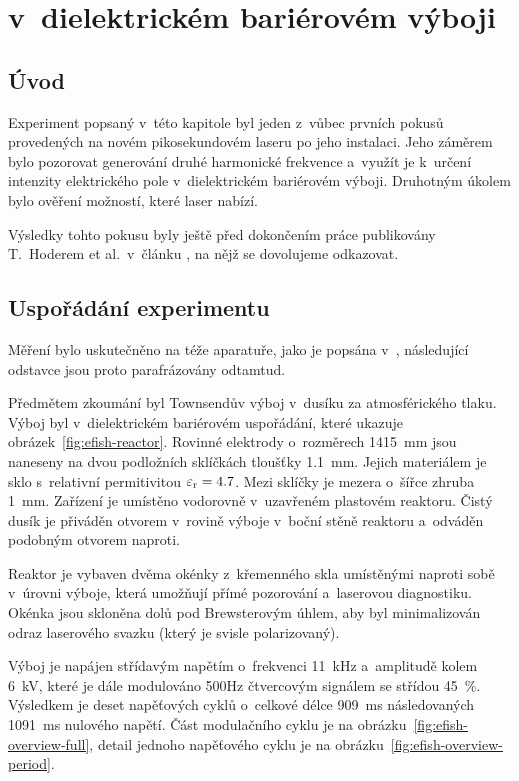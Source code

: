 \chapter[\EFISH]{{\EFISH} v~dielektrickém bariérovém výboji}

\newcommand\ypos{y}

\section{Úvod}
\label{sec:efish-intro}
Experiment popsaný v~této kapitole byl jeden z~vůbec prvních pokusů
provedených na novém pikosekundovém laseru po jeho instalaci.
Jeho záměrem bylo pozorovat generování druhé harmonické frekvence
a~využít je k~určení intenzity elektrického pole v~dielektrickém
bariérovém výboji.
%
Druhotným úkolem bylo ověření možností, které laser nabízí.

Výsledky tohto pokusu byly ještě před dokončením práce publikovány
T.~Hoderem et al.~v~článku \cite{efish-nitrogen}, na nějž se dovolujeme
odkazovat.

\section{Uspořádání experimentu}
\label{sec:efish-setup}
Měření bylo uskutečněno na téže aparatuře, jako je popsána
v~\cite{efish-nitrogen},
následující odstavce jsou proto parafrázovány odtamtud.

Předmětem zkoumání byl Townsendův výboj v~dusíku za atmosférického tlaku.
Výboj byl v~dielektrickém bariérovém uspořádání, které ukazuje
obrázek~\ref{fig:efish-reactor}.
Rovinné elektrody o~rozměrech \num{14}\times\SI{15}{\milli\metre}
jsou naneseny na dvou podložních sklíčkách tloušťky \SI{1.1}{\milli\metre}.
Jejich materiálem je sklo s~relativní permitivitou ${\varepsilon_\text{r} = \num{4.7}}$.
Mezi sklíčky je mezera o~šířce zhruba \SI{1}{\milli\metre}.
Zařízení je umístěno vodorovně v~uzavřeném plastovém reaktoru.
Čistý dusík je přiváděn otvorem v~rovině výboje v~boční stěně reaktoru
a~odváděn podobným otvorem naproti.

Reaktor je vybaven dvěma okénky z~křemenného skla umístěnými naproti
sobě v~úrovni výboje,
která umožňují přímé pozorování a~laserovou diagnostiku.
Okénka jsou skloněna dolů pod Brewsterovým úhlem, aby byl minimalizován
odraz laserového svazku (který je svisle polarizovaný).

Výboj je napájen střídavým napětím o~frekvenci \SI{11}{\kilo\hertz}
a~amplitudě kolem \SI{6}{\kilo\volt},
které je dále modulováno \num{500}\si{\hertz} čtvercovým signálem
se střídou \SI{45}{\percent}.
Výsledkem je deset napěťových cyklů o~celkové délce \SI{909}{\milli\second}
následovaných \SI{1091}{\milli\second} nulového napětí.
\autocite{efish-nitrogen}
Část modulačního cyklu je na obrázku~\ref{fig:efish-overview-full},
detail jednoho napěťového cyklu je na obrázku~\ref{fig:efish-overview-period}.


